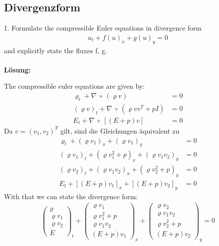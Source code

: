 \documentclass[11pt]{scrartcl}
\begin{document}
\subsection{Divergenzform}

1. Formulate the compressible Euler equations in divergence form 
\begin{align*}
	u_t+f(u)_x + g(u)_y =0 
\end{align*}
and explicitly state the fluxes f, g.
\\
\\
\textbf{Lösung:}

The compressible euler equations are given by:
\begin{align*}
	\varrho_t+ \nabla \  \circ \ (\varrho v)&=0\\
	(\varrho v)_t+ \nabla \  \circ \ (\varrho vv^T + pI)&=0\\
	E_t + \nabla \ \circ \ [(E+p)v]&=0
\end{align*}
Da $v=(v_1,v_2)^T$ gilt, sind die Gleichungen äquivalent zu
\begin{align*}
	\varrho_t+ (\varrho v_1)_x + (\varrho v_1)_y  &=0\\
	(\varrho v_1)_t+ (\varrho v_1^2 + p)_x + (\varrho v_1 v_2)_y &=0\\
	(\varrho v_2)_t+ (\varrho v_1 v_2 )_x + (\varrho v_2^2 + p)_y &=0\\
	E_t + [(E+p)v_1]_x + [(E+p)v_2]_y&=0
\end{align*}
With that we can state the divergence form:
\begin{align*}
	\left(\begin{array}{c} \varrho \\ \varrho v_1 \\ \varrho v_2 \\ E \end{array}\right)_t	+  \left(\begin{array}{c} \varrho v_1 \\ \varrho v_1^2 + p \\ \varrho v_1 v_2 \\ (E+p)v_1 \end{array}\right)_x +  \left(\begin{array}{c} \varrho v_2 \\ \varrho v_1 v_2 \\ \varrho v_2^2+p \\ (E+p)v_2 \end{array}\right)_y = 0
\end{align*}
\end{document}
